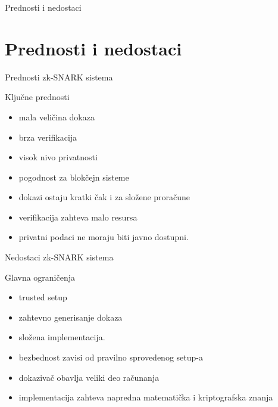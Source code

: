 \documentclass[aspectratio=1610]{beamer}
\begin{document}
\begin{frame}
\centering
\vfill

{\Huge Prednosti i nedostaci}

\vfill
\end{frame}

\section{Prednosti i nedostaci}

\begin{frame}{Prednosti zk-SNARK sistema}

\begin{block}{Ključne prednosti}
\begin{itemize}
    \item mala veličina dokaza
    \item brza verifikacija
    \item visok nivo privatnosti
    \item pogodnost za blokčejn sisteme
\end{itemize}
\end{block}

\bigskip

\begin{itemize}
    \item dokazi ostaju kratki čak i za složene proračune
    \item verifikacija zahteva malo resursa
    \item privatni podaci ne moraju biti javno dostupni.
\end{itemize}

\end{frame}

\begin{frame}{Nedostaci zk-SNARK sistema}

\begin{block}{Glavna ograničenja}
\begin{itemize}
    \item trusted setup
    \item zahtevno generisanje dokaza
    \item složena implementacija.
\end{itemize}
\end{block}

\bigskip

\begin{itemize}
    \item bezbednost zavisi od pravilno sprovedenog setup-a
    \item dokazivač obavlja veliki deo računanja
    \item implementacija zahteva napredna matematička i kriptografska znanja
\end{itemize}

\end{frame}
\end{document}
